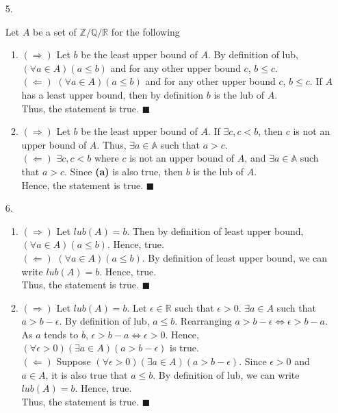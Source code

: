 \documentclass[11pt]{exam}
\begin{document}
\begin{enumerate}[leftmargin=0pt]
\item[5.] 

Let $A$ be a set of $\mathbb{Z}/\mathbb{Q}/\mathbb{R}$ for the following

\begin{enumerate}[label=(\alph*)]
    \item $(\Rightarrow)$ Let $b$ be the least upper bound of $A$. By definition of lub, $(\forall a \in A)(a \leq b)$ and for any other upper bound $c$, $b \leq c$. \\
    $(\Leftarrow)$ $(\forall a \in A)(a \leq b)$ and for any other upper bound $c$, $b \leq c$. If $A$ has a least upper bound, then by definition $b$ is the lub of $A$. \\
    Thus, the statement is true. $\blacksquare$
    \item $(\Rightarrow)$ Let $b$ be the least upper bound of $A$. If $\exists c, c < b$, then $c$ is not an upper bound of $A$. Thus, $\exists a \in \mathbb{A}$ such that $a > c$. \\
    $(\Leftarrow)$ $\exists c, c < b$ where $c$ is not an upper bound of $A$, and $\exists a \in \mathbb{A}$ such that $a > c$. Since \textbf{(a)} is also true, then $b$ is the lub of $A$. \\
    Hence, the statement is true. $\blacksquare$
\end{enumerate}

\item[6.]
\begin{enumerate}[label=(\alph*)]
    \item $(\Rightarrow)$ Let $lub(A) = b$. Then by definition of least upper bound, $(\forall a \in A)(a \leq b)$. Hence, true. \\
    $(\Leftarrow)$ $(\forall a \in A)(a \leq b)$. By definition of least upper bound, we can write $lub(A) = b$. Hence, true. \\
    Thus, the statement is true. $\blacksquare$
    \item $(\Rightarrow)$ Let $lub(A) = b$. Let $\epsilon \in \mathbb{R}$ such that $\epsilon > 0$. $\exists a \in A$ such that $a > b - \epsilon$. By definition of lub, $a \leq b$. Rearranging $a > b - \epsilon \Leftrightarrow \epsilon > b - a$. As $a$ tends to $b$, $\epsilon > b - a \Leftrightarrow \epsilon > 0$. Hence, $(\forall \epsilon > 0)(\exists a \in A)(a > b - \epsilon)$ is true. \\
    $(\Leftarrow)$ Suppose $(\forall \epsilon > 0)(\exists a \in A)(a > b - \epsilon)$. Since $\epsilon > 0$ and $a \in A$, it is also true that $a \leq b$. By definition of lub, we can write $lub(A) = b$. Hence, true. \\
    Thus, the statement is true. $\blacksquare$
\end{enumerate}


\end{enumerate}
\end{document}

